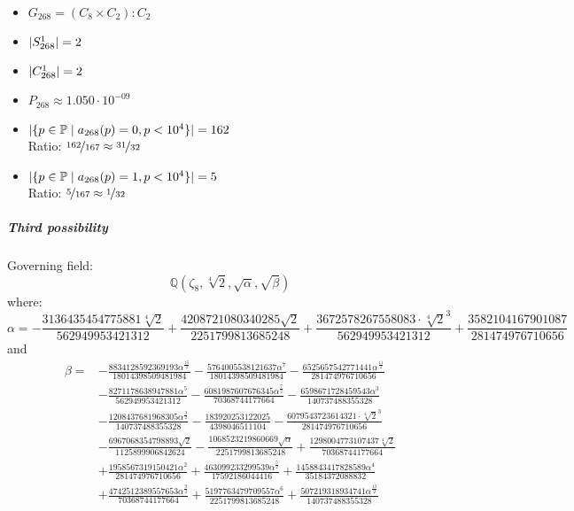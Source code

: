 \begin{multicols}{2}
	\begin{itemize}
		\item $G_{268} = (C_8 \times C_2) : C_2$
		\item $| S_{268}^1 | = 2$
		\item $| C_{268}^1 | = 2$
		\item $P_{268} \approx 1.050 \cdot 10^{-09}$
	\end{itemize}
	\begin{itemize}
		\item $| \{ p \in \mathbb{P} \mid a_{268}(p)=0, p<10^4 \} | = 162$\\
		Ratio: $\nicefrac{ 162 }{ 167 } \approx \nicefrac{ 31 }{ 32 }$
		\item $| \{ p \in \mathbb{P} \mid a_{268}(p)=1, p<10^4 \} | = 5$\\
		Ratio: $\nicefrac{ 5 }{ 167 } \approx \nicefrac{ 1 }{ 32 }$
	\end{itemize}
\end{multicols}
\subparagraph{Third possibility}
Governing field:
$$\mathbb{Q}\left(\zeta_8, \sqrt[4]{2}, \sqrt{\alpha}, \sqrt{\beta}\right)$$
where:
$$\alpha = - \frac{3136435454775881 \sqrt[4]{2}}{562949953421312} + \frac{4208721080340285 \sqrt{2}}{2251799813685248} + \frac{3672578267558083 \cdot \sqrt[4]{2}^3}{562949953421312} + \frac{3582104167901087}{281474976710656}$$
and
\begin{align*}
\beta = 
&- \frac{8834128592369193 \alpha^{\frac{15}{2}}}{18014398509481984} 
- \frac{5764005538121637 \alpha^{7}}{18014398509481984} 
- \frac{6525657542771441 \alpha^{\frac{11}{2}}}{281474976710656} 
\\
&- \frac{8271178638947881 \alpha^{5}}{562949953421312} 
- \frac{6081987607676345 \alpha^{\frac{7}{2}}}{70368744177664} 
- \frac{6598671728459543 \alpha^{3}}{140737488355328} 
\\
&- \frac{1208437681968305 \alpha^{\frac{3}{2}}}{140737488355328} 
- \frac{183920253122025}{4398046511104} 
- \frac{6079543723614321 \cdot \sqrt[4]{2}^3}{281474976710656} 
\\
&- \frac{6967068354798893 \sqrt{2}}{1125899906842624} 
- \frac{1068523219860669 \sqrt{\alpha}}{2251799813685248} 
+ \frac{1298004773107437 \sqrt[4]{2}}{70368744177664} 
\\
&+ \frac{1958567319150421 \alpha^{2}}{281474976710656} 
+ \frac{463099233299539 \alpha^{\frac{5}{2}}}{17592186044416} 
+ \frac{1458843417828589 \alpha^{4}}{35184372088832} 
\\
&+ \frac{4742512389557653 \alpha^{\frac{9}{2}}}{70368744177664} 
+ \frac{5197763479709557 \alpha^{6}}{2251799813685248} 
+ \frac{507219318934741 \alpha^{\frac{13}{2}}}{140737488355328}
\end{align*}
